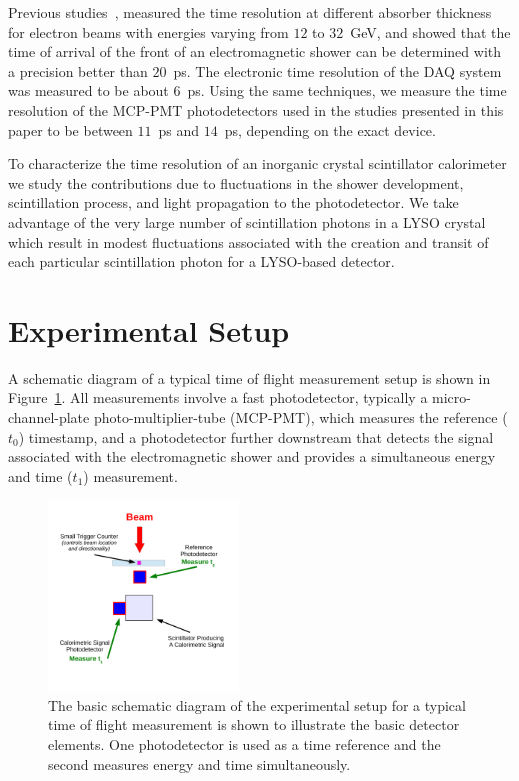 Previous studies~\cite{MCPFastCaloNIMA}, measured the time resolution at different
absorber thickness for electron beams with energies varying from $12$ to
$32$~GeV, and showed that the time of arrival of the front of an electromagnetic
shower can be determined with a precision better than $20$~ps. The electronic
time resolution of the DAQ system was measured to be about $6$~ps. Using
the same techniques, we measure the time resolution of the MCP-PMT photodetectors 
used in the studies presented in this paper  to be between $11$~ps and $14$~ps, depending 
on the exact device.

To characterize the time resolution of an inorganic crystal scintillator calorimeter we
study the contributions due to fluctuations in the shower development, scintillation process, 
and light propagation to the photodetector.  We take advantage of the very large number of 
scintillation photons in a LYSO crystal which result in modest fluctuations associated with the 
creation and transit of each particular scintillation photon for a LYSO-based detector. 

 

\section{Experimental Setup}

A schematic diagram of a typical time of flight measurement setup is shown in 
Figure~\ref{fig:TypicalSchematicDiagram}. All measurements involve a fast photodetector,  
typically a micro-channel-plate photo-multiplier-tube 
(MCP-PMT), which  measures the reference ($t_{0}$) timestamp, and a photodetector further 
downstream that detects the signal associated with the electromagnetic shower and provides 
a simultaneous energy and time ($t_{1}$) measurement. 

\begin{figure}[H] \centering
\includegraphics[width=0.45\textwidth]{figs/TypicalSchematicDiagram} 
\caption{\small The basic schematic diagram of the experimental setup for
a typical time of flight measurement is shown to illustrate the
basic detector elements. One photodetector is used as a time reference and the second 
measures energy and time simultaneously.} 
\label{fig:TypicalSchematicDiagram}
\end{figure}

